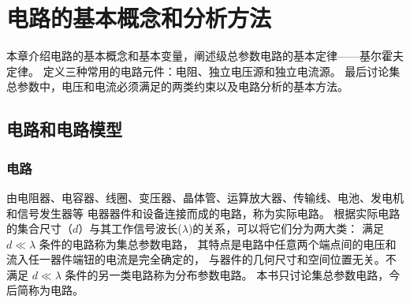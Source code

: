 \chapter{电路的基本概念和分析方法}

本章介绍电路的基本概念和基本变量，阐述级总参数电路的基本定律——基尔霍夫定律。
定义三种常用的电路元件：电阻、独立电压源和独立电流源。
最后讨论集总参数中，电压和电流必须满足的两类约束以及电路分析的基本方法。

\section{电路和电路模型}
\subsection{电路}
由电阻器、电容器、线圈、变压器、晶体管、运算放大器、传输线、电池、发电机和信号发生器等
电器器件和设备连接而成的电路，称为实际电路。
根据实际电路的集合尺寸（$d$）与其工作信号波长($\lambda$)的关系，可以将它们分为两大类：
满足 $d\ll\lambda$ 条件的电路称为集总参数电路，
其特点是电路中任意两个端点间的电压和流入任一器件端钮的电流是完全确定的，
与器件的几何尺寸和空间位置无关。不满足 $d\ll\lambda$ 条件的另一类电路称为分布参数电路。
本书只讨论集总参数电路，今后简称为电路。
